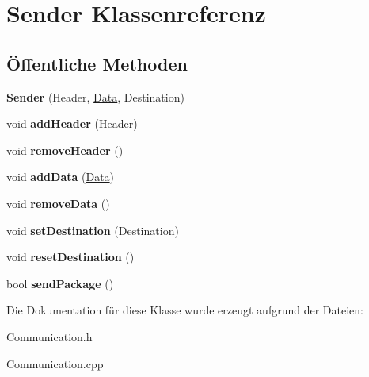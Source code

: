 \hypertarget{classSender}{\section{Sender Klassenreferenz}
\label{classSender}
}
\subsection*{Öffentliche Methoden}
\begin{DoxyCompactItemize}
\item 
\hypertarget{classSender_aa70027ddd77f43ff7c495f61d32357fe}{{\bfseries Sender} (Header, \hyperlink{classData}{Data}, Destination)}\label{classSender_aa70027ddd77f43ff7c495f61d32357fe}

\item 
\hypertarget{classSender_aaad9be7cc8e3fac6fc37adf61dfe5674}{void {\bfseries add\-Header} (Header)}\label{classSender_aaad9be7cc8e3fac6fc37adf61dfe5674}

\item 
\hypertarget{classSender_ac818fbb0dc111ab9190c70ae584661fb}{void {\bfseries remove\-Header} ()}\label{classSender_ac818fbb0dc111ab9190c70ae584661fb}

\item 
\hypertarget{classSender_a1b118e8f497778a99ed305a1d4476020}{void {\bfseries add\-Data} (\hyperlink{classData}{Data})}\label{classSender_a1b118e8f497778a99ed305a1d4476020}

\item 
\hypertarget{classSender_ab5f5921d2ca1aac87aab8848cfb34fbf}{void {\bfseries remove\-Data} ()}\label{classSender_ab5f5921d2ca1aac87aab8848cfb34fbf}

\item 
\hypertarget{classSender_aa9d2668a85f85daf4c5c7e45a1b71a79}{void {\bfseries set\-Destination} (Destination)}\label{classSender_aa9d2668a85f85daf4c5c7e45a1b71a79}

\item 
\hypertarget{classSender_a14fd132345bad96649d9189501fec0f1}{void {\bfseries reset\-Destination} ()}\label{classSender_a14fd132345bad96649d9189501fec0f1}

\item 
\hypertarget{classSender_a6136f7dbc2b07e6eb20123dea07a022e}{bool {\bfseries send\-Package} ()}\label{classSender_a6136f7dbc2b07e6eb20123dea07a022e}

\end{DoxyCompactItemize}


Die Dokumentation für diese Klasse wurde erzeugt aufgrund der Dateien\-:\begin{DoxyCompactItemize}
\item 
Communication.\-h\item 
Communication.\-cpp\end{DoxyCompactItemize}
